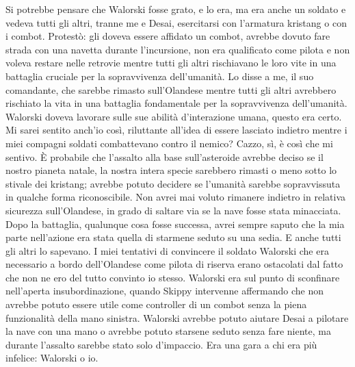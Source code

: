 Si potrebbe pensare che Walorski fosse grato, e lo era, ma era anche un
soldato e vedeva tutti gli altri, tranne me e Desai, esercitarsi con
l'armatura kristang o con i combot. Protestò: gli doveva essere affidato
un combot, avrebbe dovuto fare strada con una navetta durante
l'incursione, non era qualificato come pilota e non voleva restare nelle
retrovie mentre tutti gli altri rischiavano le loro vite in una
battaglia cruciale per la sopravvivenza dell'umanità. Lo disse a me, il
suo comandante, che sarebbe rimasto sull'Olandese mentre tutti gli altri
avrebbero rischiato la vita in una battaglia fondamentale per la
sopravvivenza dell'umanità. Walorski doveva lavorare sulle sue abilità
d'interazione umana, questo era certo. Mi sarei sentito anch'io così,
riluttante all'idea di essere lasciato indietro mentre i miei compagni
soldati combattevano contro il nemico? Cazzo, sì, è così che mi sentivo.
È probabile che l'assalto alla base sull'asteroide avrebbe deciso se il
nostro pianeta natale, la nostra intera specie sarebbero rimasti o meno
sotto lo stivale dei kristang; avrebbe potuto decidere se l'umanità
sarebbe sopravvissuta in qualche forma riconoscibile. Non avrei mai
voluto rimanere indietro in relativa sicurezza sull'Olandese, in grado
di saltare via se la nave fosse stata minacciata. Dopo la battaglia,
qualunque cosa fosse successa, avrei sempre saputo che la mia parte
nell'azione era stata quella di starmene seduto su una sedia. E anche
tutti gli altri lo sapevano. I miei tentativi di convincere il soldato
Walorski che era necessario a bordo dell'Olandese come pilota di riserva
erano ostacolati dal fatto che non ne ero del tutto convinto io stesso.
Walorski era sul punto di sconfinare nell'aperta insubordinazione,
quando Skippy intervenne affermando che non avrebbe potuto essere utile
come controller di un combot senza la piena funzionalità della mano
sinistra. Walorski avrebbe potuto aiutare Desai a pilotare la nave con
una mano o avrebbe potuto starsene seduto senza fare niente, ma durante
l'assalto sarebbe stato solo d'impaccio. Era una gara a chi era più
infelice: Walorski o io.

\hfill\break

